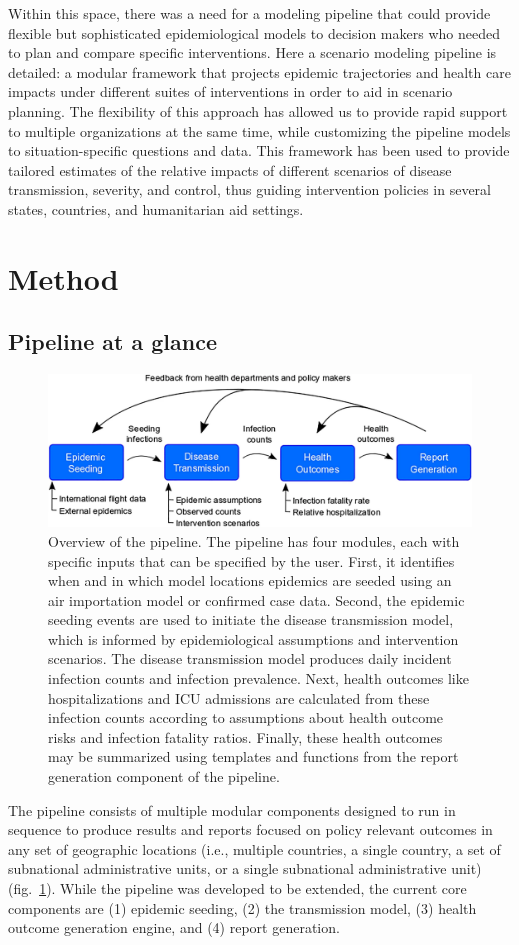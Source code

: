 Within this space, there was a need for a modeling pipeline that could provide flexible but sophisticated epidemiological models to decision makers who needed to plan and compare specific interventions. Here a scenario modeling pipeline is detailed: a modular framework that projects epidemic trajectories and health care impacts under different suites of interventions in order to aid in scenario planning. The flexibility of this approach has allowed us to provide rapid support to multiple organizations at the same time, while customizing the pipeline models to situation-specific questions and data. This framework has been used to provide tailored estimates of the relative impacts of different scenarios of disease transmission, severity, and control, thus guiding intervention policies in several states, countries, and humanitarian aid settings.

\section{Method}
\subsection{Pipeline at a glance}
\begin{figure}[!htb]
    \centering
    \includegraphics[width = .8\textwidth]{fig_pipeline/fig1a}
    \caption[Overview of the pipeline]{Overview of the pipeline. The pipeline has four modules, each with specific inputs that can be specified by the user. First, it identifies when and in which model locations epidemics are seeded using an air importation model or confirmed case data. Second, the epidemic seeding events are used to initiate the disease transmission model, which is informed by epidemiological assumptions and intervention scenarios. The disease transmission model produces daily incident infection counts and infection prevalence. Next, health outcomes like hospitalizations and ICU admissions are calculated from these infection counts according to assumptions about health outcome risks and infection fatality ratios. Finally, these health outcomes may be summarized using templates and functions from the report generation component of the pipeline.}
    \label{fig:pipeline-modules}
\end{figure}
The pipeline consists of multiple modular components designed to run in sequence to produce results and reports focused on policy relevant outcomes in any set of geographic locations (i.e., multiple countries, a single country, a set of subnational administrative units, or a single subnational administrative unit) (fig.~\ref{fig:pipeline-modules}). While the pipeline was developed to be extended, the current core components are (1) epidemic seeding, (2) the transmission model, (3) health outcome generation engine, and (4) report generation. 

